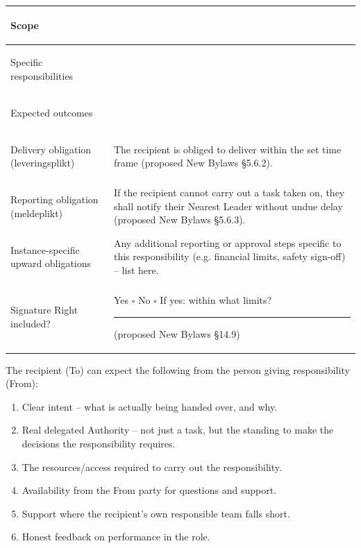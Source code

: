 \documentclass{../../../Common/Latex/Templates/rapport}
\begin{document}
\begin{tabularx}{\textwidth}{|>{\bfseries\raggedright\arraybackslash}p{4.5cm}|X|}
  \hline
  Scope                                & \rule{0pt}{1.6cm}                                                                                                                                             \\
  \hline
  Specific responsibilities            & \rule{0pt}{1.8cm}                                                                                                                                             \\
  \hline
  Expected outcomes                    & \rule{0pt}{1.6cm}                                                                                                                                             \\
  \hline
  Delivery obligation (leveringsplikt) & \rule{0pt}{1.2cm}The recipient is obliged to deliver within the set time frame (proposed New Bylaws \S5.6.2).                                                 \\
  \hline
  Reporting obligation (meldeplikt)    & \rule{0pt}{1.2cm}If the recipient cannot carry out a task taken on, they shall notify their Nearest Leader without undue delay (proposed New Bylaws \S5.6.3). \\
  \hline
  Instance-specific upward obligations & \rule{0pt}{1.6cm}Any additional reporting or approval steps specific to this responsibility (e.g. financial limits, safety sign-off) -- list here.            \\
  \hline
  Signature Right included?            & \rule{0pt}{1cm}Yes \quad $\square$ \quad\quad No \quad $\square$ \quad\quad If yes: within what limits? \rule{3cm}{0.4pt} (proposed New Bylaws \S14.9)        \\
  \hline
\end{tabularx}

The recipient (To) can expect the following from the person giving responsibility (From):
\begin{enumerate}
  \item Clear intent -- what is actually being handed over, and why.
  \item Real delegated Authority -- not just a task, but the standing to make the decisions the responsibility requires.
  \item The resources/access required to carry out the responsibility.
  \item Availability from the From party for questions and support.
  \item Support where the recipient's own responsible team falls short.
  \item Honest feedback on performance in the role.
\end{enumerate}
\end{document}
